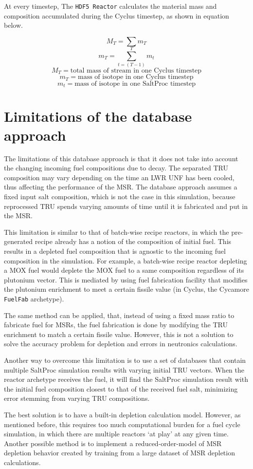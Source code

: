At every timestep, 
The \texttt{HDF5 Reactor} calculates the material mass
and composition accumulated during the Cyclus timestep,
as shown in equation below.

\[
M_{T} = \sum m_T
\]
\[
m_{T} = \sum_{t=(T-1)}^{T} m_{t}
\]
\[
M_T = \text{total mass of stream in one Cyclus timestep}
\]
\[
m_T = \text{mass of isotope in one Cyclus timestep}
\]
\[
m_t = \text{mass of isotope in one SaltProc timestep}
\]


\section{Limitations of the database approach}
\label{sec:limit}
The limitations of this database approach is that it does not
take into account the changing incoming fuel compositions due to decay.
The separated \gls{TRU} composition may vary depending on the time
an \gls{LWR} \gls{UNF} has been cooled, thus affecting the performance
of the \gls{MSR}. The database approach assumes a fixed input salt
composition, which is not the case in this simulation, because reprocessed
\gls{TRU} spends varying amounts of time until it is fabricated and
put in the \gls{MSR}.

This limitation is similar to that of batch-wise recipe reactors, in which the 
pre-generated recipe already has a notion of the composition of initial fuel.
This results in a depleted fuel composition that is agnostic to the incoming
fuel composition in the simulation. For example, a batch-wise recipe reactor
depleting a \gls{MOX} fuel would deplete the \gls{MOX} fuel to a same
composition regardless of its plutonium vector. This is mediated by using
fuel fabrication facility that modifies the plutonium enrichment to
meet a certain fissile value (in Cyclus, the Cycamore \texttt{FuelFab} archetype).

The same method can be applied, that, instead of using a fixed mass ratio
to fabricate fuel for \glspl{MSR}, the fuel fabrication is done by modifying
the \gls{TRU} enrichment to match a certain fissile value. However, this is
not a solution to solve the accuracy problem for depletion and errors
in neutronics calculations.

Another way to overcome this limitation is to use a set of databases 
that contain multiple SaltProc simulation results with varying initial \gls{TRU}
vectors. When the reactor archetype receives the fuel, it will find the
SaltProc simulation result with the initial fuel composition closest to that
of the received fuel salt, minimizing error stemming from varying
\gls{TRU} compositions.

The best solution is to have a built-in depletion calculation model. However,
as mentioned before, this requires too much computational burden for a fuel cycle simulation,
in which there are multiple reactors `at play' at any given time. Another
possible method is to implement a reduced-order-model of \gls{MSR} depletion
behavior created by training from a large dataset of \gls{MSR} depletion
calculations. 